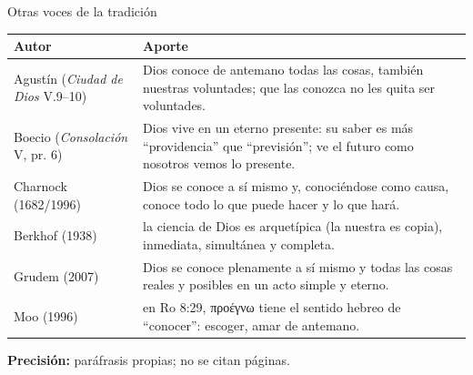 \documentclass[hyperref={bookmarks=false},aspectratio=169]{beamer}
\newcommand{\grc}[1]{\foreignlanguage{ancientgreek}{#1}}
\newcommand{\precision}[1]{{\footnotesize\color{gris}\textbf{Precisión:} #1}}
\begin{document}
\begin{frame}{Otras voces de la tradición}
\scriptsize\renewcommand{\arraystretch}{1.2}
\begin{tabular}{@{}>{\RaggedRight\arraybackslash}p{2.6cm}>{\RaggedRight\arraybackslash}p{9.2cm}@{}}
\toprule
\textbf{Autor} & \textbf{Aporte} \\ \midrule
Agustín (\emph{Ciudad de Dios} V.9--10) & Dios conoce de antemano todas las cosas, también nuestras voluntades; que las conozca no les quita ser voluntades. \\
Boecio (\emph{Consolación} V, pr. 6) & Dios vive en un eterno presente: su saber es más ``providencia'' que ``previsión''; ve el futuro como nosotros vemos lo presente. \\
Charnock (1682/1996) & Dios se conoce a sí mismo y, conociéndose como causa, conoce todo lo que puede hacer y lo que hará. \\
Berkhof (1938) & la ciencia de Dios es arquetípica (la nuestra es copia), inmediata, simultánea y completa. \\
Grudem (2007) & Dios se conoce plenamente a sí mismo y todas las cosas reales y posibles en un acto simple y eterno. \\
Moo (1996) & en Ro 8:29, \grc{προέγνω} tiene el sentido hebreo de ``conocer'': escoger, amar de antemano. \\
\bottomrule
\end{tabular}\par\smallskip
\precision{paráfrasis propias; no se citan páginas.}
\end{frame}
\end{document}
